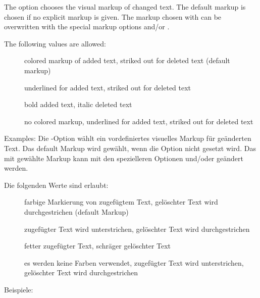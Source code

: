 \ifENGLISH
	The  option chooses the visual markup of changed text.
	The default markup is chosen if no explicit markup is given.
	The markup chosen with  can be overwritten with the special markup options  and/or .

	The following values are allowed:
	\begin{description}
		\item [] colored markup of added text, striked out for deleted text (default markup)
		\item [] underlined for added text, striked out for deleted text
		\item [] bold added text, italic deleted text
		\item [] no colored markup, underlined for added text, striked out for deleted text
	\end{description}

	Examples:
\fi
	\ifGERMAN
		Die -Option wählt ein vordefiniertes visuelles Markup für geänderten Text.
		Das default Markup wird gewählt, wenn die Option nicht gesetzt wird.
		Das mit  gewählte Markup kann mit den spezielleren Optionen  und/oder  geändert werden.

		Die folgenden Werte sind erlaubt:
		\begin{description}
			\item [] farbige Markierung von zugefügtem Text, gelöschter Text wird durchgestrichen (default Markup)
			\item [] zugefügter Text wird unterstrichen, gelöschter Text wird durchgestrichen
			\item [] fetter zugefügter Text, schräger gelöschter Text
			\item [] es werden keine Farben verwendet, zugefügter Text wird unterstrichen, gelöschter Text wird durchgestrichen
		\end{description}

		Beispiele:
	\fi

\\
\\
\\

